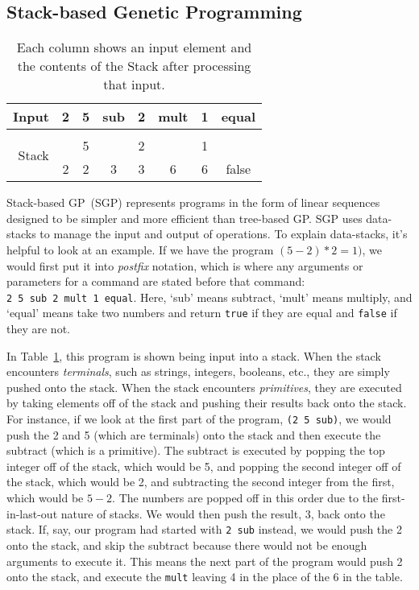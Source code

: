 \documentclass{sig-alternate}
\begin{document}
\subsection{Stack-based Genetic Programming}
\label{sec:sgp}
\begin{table}
	\centering
	\begin{tabular}{|r|c|c|c|c|c|c|c|}
		\hline
		Input & 2 & 5 & sub & 2 & mult & 1 & equal\\
		\hline
		\multirow{3}{*}{Stack} & & & & & & & \\
		&   & 5 &   & 2 &   & 1 & \\
		& 2 & 2 & 3 & 3 & 6 & 6 & false \\
		\hline
	\end{tabular}
	\caption{Each column shows an input element and the contents of the Stack after processing that input.}
	\label{tab:stacks}
\end{table}

Stack-based GP~(SGP) represents programs in the form of linear sequences designed to be simpler and more efficient than tree-based GP. SGP uses data-stacks to manage the input and output of operations. To explain data-stacks, it's helpful to look at an example. If we have the program $(5-2)*2=1)$, we would first put it into \textit{postfix} notation, which is where any arguments or parameters for a command are stated before that command: \texttt{2~5~sub~2~mult~1~equal}. Here, `sub' means subtract, `mult' means multiply, and `equal' means take two numbers and return \texttt{true} if they are equal and \texttt{false} if they are not.

In Table~\ref{tab:stacks}, this program is shown being input into a stack. When the stack encounters \textit{terminals}, such as strings, integers, booleans, etc., they are simply pushed onto the stack. When the stack encounters \textit{primitives}, they are executed by taking elements off of the stack and pushing their results back onto the stack. For instance, if we look at the first part of the program, \texttt{(2~5~sub)}, we would push the 2 and 5 (which are terminals) onto the stack and then execute the subtract (which is a primitive). The subtract is executed by popping the top integer off of the stack, which would be 5, and popping the second integer off of the stack, which would be 2, and subtracting the second integer from the first, which would be $5-2$. The numbers are popped off in this order due to the first-in-last-out nature of stacks. We would then push the result, 3, back onto the stack. If, say, our program had started with \texttt{2 sub} instead, we would push the 2 onto the stack, and skip the subtract because there would not be enough arguments to execute it. This means the next part of the program would push 2 onto the stack, and execute the \texttt{mult} leaving 4 in the place of the 6 in the table.
\end{document}
